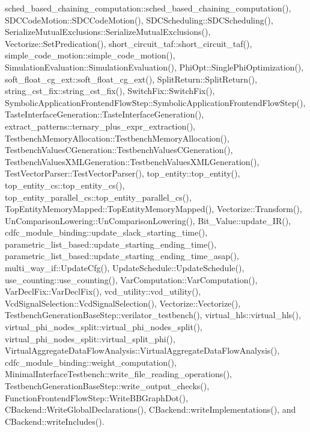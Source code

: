 sched\+\_\+based\+\_\+chaining\+\_\+computation\+::sched\+\_\+based\+\_\+chaining\+\_\+computation(), S\+D\+C\+Code\+Motion\+::\+S\+D\+C\+Code\+Motion(), S\+D\+C\+Scheduling\+::\+S\+D\+C\+Scheduling(), Serialize\+Mutual\+Exclusions\+::\+Serialize\+Mutual\+Exclusions(), Vectorize\+::\+Set\+Predication(), short\+\_\+circuit\+\_\+taf\+::short\+\_\+circuit\+\_\+taf(), simple\+\_\+code\+\_\+motion\+::simple\+\_\+code\+\_\+motion(), Simulation\+Evaluation\+::\+Simulation\+Evaluation(), Phi\+Opt\+::\+Single\+Phi\+Optimization(), soft\+\_\+float\+\_\+cg\+\_\+ext\+::soft\+\_\+float\+\_\+cg\+\_\+ext(), Split\+Return\+::\+Split\+Return(), string\+\_\+cst\+\_\+fix\+::string\+\_\+cst\+\_\+fix(), Switch\+Fix\+::\+Switch\+Fix(), Symbolic\+Application\+Frontend\+Flow\+Step\+::\+Symbolic\+Application\+Frontend\+Flow\+Step(), Taste\+Interface\+Generation\+::\+Taste\+Interface\+Generation(), extract\+\_\+patterns\+::ternary\+\_\+plus\+\_\+expr\+\_\+extraction(), Testbench\+Memory\+Allocation\+::\+Testbench\+Memory\+Allocation(), Testbench\+Values\+C\+Generation\+::\+Testbench\+Values\+C\+Generation(), Testbench\+Values\+X\+M\+L\+Generation\+::\+Testbench\+Values\+X\+M\+L\+Generation(), Test\+Vector\+Parser\+::\+Test\+Vector\+Parser(), top\+\_\+entity\+::top\+\_\+entity(), top\+\_\+entity\+\_\+cs\+::top\+\_\+entity\+\_\+cs(), top\+\_\+entity\+\_\+parallel\+\_\+cs\+::top\+\_\+entity\+\_\+parallel\+\_\+cs(), Top\+Entity\+Memory\+Mapped\+::\+Top\+Entity\+Memory\+Mapped(), Vectorize\+::\+Transform(), Un\+Comparison\+Lowering\+::\+Un\+Comparison\+Lowering(), Bit\+\_\+\+Value\+::update\+\_\+\+I\+R(), cdfc\+\_\+module\+\_\+binding\+::update\+\_\+slack\+\_\+starting\+\_\+time(), parametric\+\_\+list\+\_\+based\+::update\+\_\+starting\+\_\+ending\+\_\+time(), parametric\+\_\+list\+\_\+based\+::update\+\_\+starting\+\_\+ending\+\_\+time\+\_\+asap(), multi\+\_\+way\+\_\+if\+::\+Update\+Cfg(), Update\+Schedule\+::\+Update\+Schedule(), use\+\_\+counting\+::use\+\_\+counting(), Var\+Computation\+::\+Var\+Computation(), Var\+Decl\+Fix\+::\+Var\+Decl\+Fix(), vcd\+\_\+utility\+::vcd\+\_\+utility(), Vcd\+Signal\+Selection\+::\+Vcd\+Signal\+Selection(), Vectorize\+::\+Vectorize(), Testbench\+Generation\+Base\+Step\+::verilator\+\_\+testbench(), virtual\+\_\+hls\+::virtual\+\_\+hls(), virtual\+\_\+phi\+\_\+nodes\+\_\+split\+::virtual\+\_\+phi\+\_\+nodes\+\_\+split(), virtual\+\_\+phi\+\_\+nodes\+\_\+split\+::virtual\+\_\+split\+\_\+phi(), Virtual\+Aggregate\+Data\+Flow\+Analysis\+::\+Virtual\+Aggregate\+Data\+Flow\+Analysis(), cdfc\+\_\+module\+\_\+binding\+::weight\+\_\+computation(), Minimal\+Interface\+Testbench\+::write\+\_\+file\+\_\+reading\+\_\+operations(), Testbench\+Generation\+Base\+Step\+::write\+\_\+output\+\_\+checks(), Function\+Frontend\+Flow\+Step\+::\+Write\+B\+B\+Graph\+Dot(), C\+Backend\+::\+Write\+Global\+Declarations(), C\+Backend\+::write\+Implementations(), and C\+Backend\+::write\+Includes().

